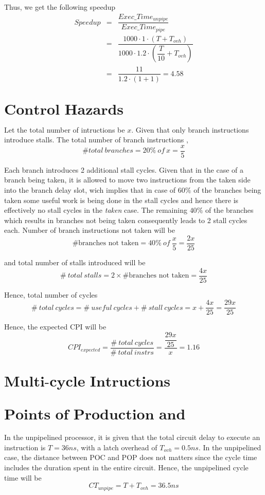 \documentclass{tufte-handout}
\begin{document}
	Thus, we get the following speedup
	\begin{eqnarray*}
		Speedup &=& \dfrac{Exec\_Time_{unpipe}}{Exec\_Time_{pipe}} \\
		&=& \dfrac{1000 \cdot 1 \cdot (T + T_{ovh})}{1000 \cdot 1.2 \cdot (\dfrac{T}{10} + T_{ovh})} \\
		&=& \dfrac{11}{1.2 \cdot (1 + 1)} = \mathbf{4.58}
	\end{eqnarray*}

  \section{$\textbf{Control Hazards}$}
  Let the total number of intructions be $x$. Given that only branch instructions introduce stalls.
  The total number of branch instructions ,
  \[
  	\# total\ branches = 20\%\ of\ x = \dfrac{x}{5}
  \]

  Each branch introduces 2 additional stall cycles. Given that in the case of a branch being taken, it is allowed to move two instructions from the taken side into the branch delay slot, wich implies that in case of $60\%$ of the branches being taken some useful work is being done in the stall cycles and hence there is effectively no stall cycles in the \emph{taken} case. The remaining $40\%$ of the branches which results in branches not being taken consequently leads to 2 stall cycles each. 
  Number of branch instructions not taken will be
  \[
  	\mbox{\# branches not taken} = 40\%\ of\ \dfrac{x}{5} = \dfrac{2x}{25}
  \]

  and total number of stalls introduced will be
  \[
  	\#\ total\ stalls = 2 \times \mbox{\# branches not taken} = \dfrac{4x}{25}
  \]

  Hence, total number of cycles
  \[
  	 \#\ total\ cycles = \#\ useful\ cycles + \#\ stall\ cycles = x + \dfrac{4x}{25} = \dfrac{29x}{25}
  \]

  Hence, the expected CPI will be
  \[
  	CPI_{expected} = \dfrac{\#\ total\ cycles}{\#\ total\ instrs} = \dfrac{\dfrac{29x}{25}}{x} = \mathbf{1.16}
  \]

  \section{$\textbf{Multi-cycle Intructions}$}

  \section{$\textbf{Points of Production and Consumption}$}
    In the unpipelined processor, it is given that the total circuit delay to execute an instruction is $T = 36 ns$, with a latch overhead of $T_{ovh} = 0.5 ns$. In the unpipelined case, the distance between POC and POP does not matters since the cycle time includes the duration spent in the entire circuit. Hence, the unpipelined cycle time will be
	\[
		CT_{unpipe} = T + T_{ovh} = 36.5 ns
	\]
\end{document}
